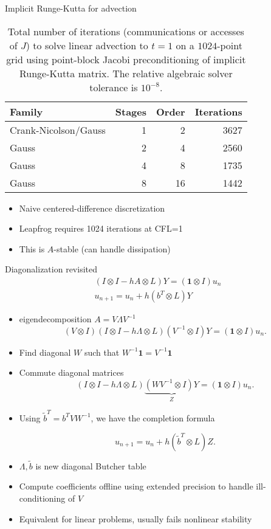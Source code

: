 \documentclass{beamer}
\begin{document}
\begin{frame}{Implicit Runge-Kutta for advection}
  \begin{table}
    \centering
    \caption{Total number of iterations (communications or accesses of $J$) to solve linear advection to $t=1$ on a $1024$-point grid using point-block Jacobi preconditioning of implicit Runge-Kutta matrix.
      The relative algebraic solver tolerance is $10^{-8}$.}\label{tab:irk-advection}
    \begin{tabular}{lrrr}
      \toprule
      Family & Stages & Order & Iterations \\
      \midrule
      Crank-Nicolson/Gauss & 1 & 2 & 3627 \\
      Gauss & 2 & 4 & 2560 \\
      Gauss & 4 & 8 & 1735 \\
      Gauss & 8 & 16 & 1442 \\
      \bottomrule
    \end{tabular}
  \end{table}
  \begin{itemize}
  \item Naive centered-difference discretization
  \item Leapfrog requires 1024 iterations at CFL=1
  \item This is $A$-stable (can handle dissipation)
  \end{itemize}
\end{frame}

\begin{frame}{Diagonalization revisited}
  \begin{gather} (I \otimes I - hA \otimes L) Y = (\mathbf{1} \otimes I) u_n \\
    u_{n+1} = u_n + h (b^T \otimes L) Y \end{gather}
  \begin{itemize}
  \item eigendecomposition $A = V \Lambda V^{-1}$
    $$ (V \otimes I) (I \otimes I - h \Lambda \otimes L) (V^{-1} \otimes I)Y = (\mathbf 1 \otimes I) u_n . $$
  \item Find diagonal $W$ such that $W^{-1} \mathbf 1 = V^{-1} \mathbf 1$
  \item Commute diagonal matrices
    $$ (I \otimes I - h \Lambda \otimes L) \underbrace{(WV^{-1} \otimes I)Y}_Z = (\mathbf 1 \otimes I) u_n . $$
  \item Using $\tilde b^T = b^T V W^{-1}$, we have the completion formula

    $$ u_{n+1} = u_n + h (\tilde b^T \otimes L) Z . $$
  \item $\Lambda, \tilde b$ is new diagonal Butcher table
  \item Compute coefficients offline using extended precision to handle ill-conditioning of $V$
  \item Equivalent for linear problems, usually fails nonlinear stability
  \end{itemize}
\end{frame}
\end{document}
